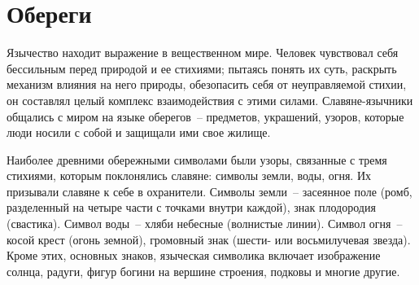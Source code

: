 \documentclass[pscyr,chapters]{hedwork}
\begin{document}
  \chapter{Обереги}
  
  Язычество находит выражение в вещественном мире. Человек чувствовал себя
  бессильным перед природой и ее стихиями; пытаясь понять их суть, раскрыть
  механизм влияния на него природы, обезопасить себя от неуправляемой стихии, он
  составлял целый комплекс взаимодействия с этими силами. Славяне-язычники
  общались с миром на языке оберегов~-- предметов, украшений, узоров, которые
  люди носили с собой и защищали ими свое жилище.

  Наиболее древними обережными символами были узоры, связанные с тремя стихиями,
  которым поклонялись славяне: символы земли, воды, огня. Их призывали славяне к
  себе в охранители. Символы земли~-- засеянное поле (ромб, разделенный на
  четыре части с точками внутри каждой), знак плодородия (свастика). Символ
  воды~-- хляби небесные (волнистые линии). Символ огня~-- косой крест (огонь
  земной), громовный знак (шести- или восьмилучевая звезда). Кроме этих,
  основных знаков, языческая символика включает изображение солнца, радуги,
  фигур богини на вершине строения, подковы и многие другие.
\end{document}
